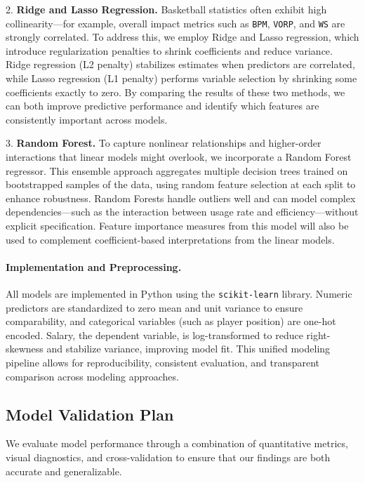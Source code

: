 \documentclass{article}
\theoremstyle{plain}
\theoremstyle{definition}
\theoremstyle{remark}
\begin{document}
2. \textbf{Ridge and Lasso Regression.}
Basketball statistics often exhibit high collinearity—for example, overall impact metrics such as \texttt{BPM}, \texttt{VORP}, and \texttt{WS} are strongly correlated. To address this, we employ Ridge and Lasso regression, which introduce regularization penalties to shrink coefficients and reduce variance. Ridge regression (L2 penalty) stabilizes estimates when predictors are correlated, while Lasso regression (L1 penalty) performs variable selection by shrinking some coefficients exactly to zero. By comparing the results of these two methods, we can both improve predictive performance and identify which features are consistently important across models.

3. \textbf{Random Forest.}
To capture nonlinear relationships and higher-order interactions that linear models might overlook, we incorporate a Random Forest regressor. This ensemble approach aggregates multiple decision trees trained on bootstrapped samples of the data, using random feature selection at each split to enhance robustness. Random Forests handle outliers well and can model complex dependencies—such as the interaction between usage rate and efficiency—without explicit specification. Feature importance measures from this model will also be used to complement coefficient-based interpretations from the linear models.

\paragraph{Implementation and Preprocessing.}
All models are implemented in Python using the \texttt{scikit-learn} library. Numeric predictors are standardized to zero mean and unit variance to ensure comparability, and categorical variables (such as player position) are one-hot encoded. Salary, the dependent variable, is log-transformed to reduce right-skewness and stabilize variance, improving model fit. This unified modeling pipeline allows for reproducibility, consistent evaluation, and transparent comparison across modeling approaches.

\subsection*{Model Validation Plan}

We evaluate model performance through a combination of quantitative metrics, visual diagnostics, and cross-validation to ensure that our findings are both accurate and generalizable.
\end{document}
